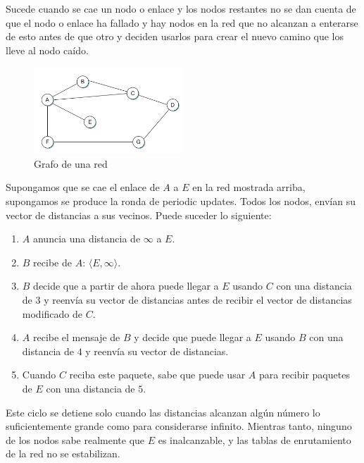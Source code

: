 Sucede cuando se cae un nodo o enlace y los nodos restantes no se dan cuenta de que el nodo o enlace ha fallado y hay nodos en la red que no alcanzan a enterarse de esto antes de que otro y deciden usarlos para crear el nuevo camino que los lleve al nodo caído. 
\begin{figure}[H]
	\centering
	\includegraphics[width=0.5\textwidth
]{images/network-graph.png}
	\caption[Grafo de una red]{Grafo de una red}
	\label{fig:network-graph}
\end{figure}

Supongamos que se cae el enlace de \(A\) a \(E\) en la red mostrada arriba, supongamos se produce la ronda de periodic updates. Todos los nodos, envían su vector de distancias a sus vecinos. Puede suceder lo siguiente:
\begin{enumerate}
  \item  \(A\) anuncia una distancia de \(\infty\) a \(E\).
  \item \(B\) recibe de \(A\): \(\langle E,\infty\rangle\).
  \item \(B\) decide que a partir de ahora puede llegar a \(E\) usando \(C\) con una distancia de \(3\) y reenvía su vector de distancias antes de recibir el vector de distancias modificado de \(C\).
  \item \(A\) recibe el mensaje de \(B\) y decide que puede llegar a \(E\) usando \(B\) con una distancia de \(4\) y reenvía su vector de distancias.
  \item Cuando \(C\) reciba este paquete, sabe que puede usar \(A\) para recibir paquetes de \(E\) con una distancia de \(5\).
\end{enumerate}

Este ciclo se detiene solo cuando las distancias alcanzan algún número lo suficientemente grande como para considerarse infinito. Mientras tanto, ninguno de los nodos sabe realmente que \(E\) es inalcanzable, y las tablas de enrutamiento de la red no se estabilizan.

